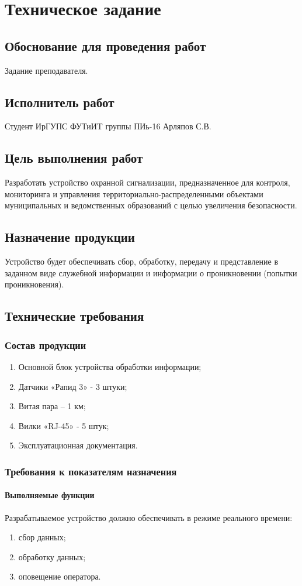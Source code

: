 \chapter{Техническое задание}
	\section{Обоснование для проведения работ}
		Задание преподавателя.
	\section{Исполнитель работ}
		Студент ИрГУПС ФУТиИT группы ПИь-16 Арляпов С.В.
	\section{Цель выполнения работ}
		Разработать устройство охранной сигнализации, предназначенное для контроля, мониторинга и управления территориально-распределенными объектами муниципальных и ведомственных образований с целью увеличения безопасности.
	\section{Назначение продукции}
		Устройство будет обеспечивать сбор, обработку, передачу и представление в заданном виде служебной информации и информации о проникновении (попытки проникновения).
	\section{Технические требования}
		\subsection{Состав продукции}
		 	\begin{enumerate}
				\item Основной блок устройства обработки информации;
				\item Датчики «Рапид 3» - 3 штуки;
				\item Витая пара – 1 км;
				\item Вилки «RJ-45» - 5 штук;
				\item Эксплуатационная документация.
			\end{enumerate}
		\subsection{Требования к показателям назначения}
			\subsubsection{Выполняемые функции}
				Разрабатываемое устройство должно обеспечивать в режиме реального времени:
				\begin{enumerate}
					\item сбор данных;
					\item обработку данных;
					\item оповещение оператора.
				\end{enumerate}
